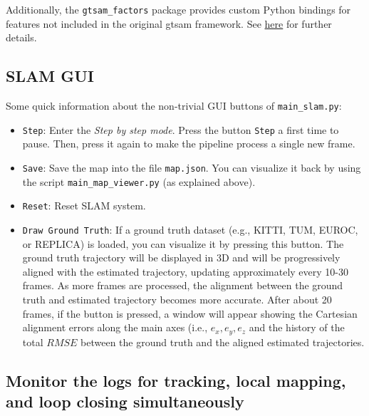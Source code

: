 \documentclass{article}
\begin{document}
Additionally, the \texttt{gtsam\_factors} package provides custom Python
bindings for features not included in the original gtsam framework. See
\href{./thirdparty/gtsam_factors/README.md}{here} for further details.

\hypertarget{slam-gui}{%
\subsection{SLAM GUI}\label{slam-gui}}

Some quick information about the non-trivial GUI buttons of \texttt{main\_slam.py}:

\begin{itemize}
    \item \texttt{Step}: Enter the \emph{Step by step mode}. Press the button \texttt{Step} a first time to pause. Then, press it again to make the pipeline process a single new frame.

    \item \texttt{Save}: Save the map into the file \texttt{map.json}. You can visualize it back by using the script \texttt{main\_map\_viewer.py} (as explained above).

    \item \texttt{Reset}: Reset SLAM system.

    \item \texttt{Draw Ground Truth}: If a ground truth dataset (e.g., KITTI,
    TUM, EUROC, or REPLICA) is loaded, you can visualize it by pressing this
    button. The ground truth trajectory will be displayed in 3D and will be
    progressively aligned with the estimated trajectory, updating
    approximately every 10-30 frames. As more frames are processed, the
    alignment between the ground truth and estimated trajectory becomes more
    accurate. After about 20 frames, if the button is pressed, a window will
    appear showing the Cartesian alignment errors along the main axes (i.e.,
    $e_x, e_y, e_z$ and the history of the total $RMSE$ between
    the ground truth and the aligned estimated trajectories.
\end{itemize}

\hypertarget{monitor-the-logs-for-tracking-local-mapping-and-loop-closing-simultaneously}{%
\subsection{Monitor the logs for tracking, local mapping, and loop
closing
simultaneously}\label{monitor-the-logs-for-tracking-local-mapping-and-loop-closing-simultaneously}}
\end{document}
